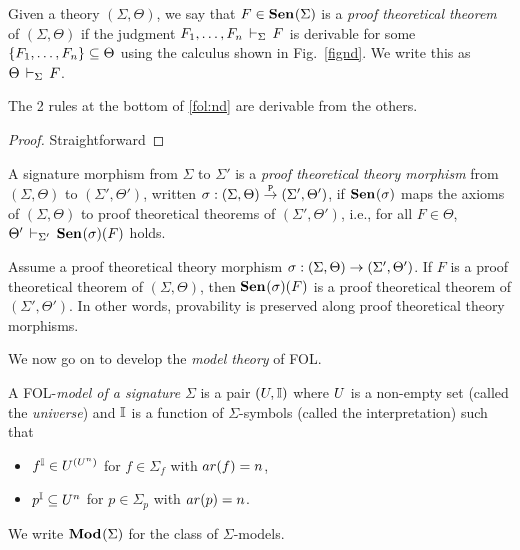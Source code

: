\documentclass{article}
\begin{document}
\begin{definition}
Given a theory $(\Sigma,\Theta)$, we say that $F\in{\mathbf{Sen}^{}}(\Sigma)$ is a \emph{proof theoretical theorem} of $(\Sigma,\Theta)$ if the judgment $F_1,\ldots,F_n\,\vdash_{\Sigma}\,F$ is derivable for some $\{F_1,\ldots,F_n\}\subseteq\Theta$ using the calculus shown in Fig.~\ref{fignd}. We write this as $\Theta\,\vdash_{\Sigma}\,F$.
\end{definition}

\begin{lemma} 
The 2 rules at the bottom of \ref{fol:nd} are derivable from the others.
\end{lemma}

\begin{proof}
Straightforward
\end{proof}

\begin{definition}
A signature morphism from $\Sigma$ to $\Sigma'$ is a \emph{proof theoretical theory morphism} from $(\Sigma,\Theta)$ to $(\Sigma',\Theta')$, written  $\sigma:(\Sigma,\Theta)\stackrel{\mathtt{P}}{\rightarrow}(\Sigma',\Theta')$, if ${\mathbf{Sen}^{}}(\sigma)$ maps the axioms of $(\Sigma,\Theta)$ to proof theoretical theorems of $(\Sigma',\Theta')$, i.e., for all $F\in\Theta$,
$\Theta'\,\vdash_{\Sigma'}\,{\mathbf{Sen}^{}}({\sigma})(F)$ holds.
\end{definition}

\begin{lemma}
Assume a proof theoretical theory morphism\linebreak
$\sigma:(\Sigma,\Theta)\rightarrow(\Sigma',\Theta')$. If $F$ is a proof theoretical theorem of $(\Sigma,\Theta)$, then ${\mathbf{Sen}^{}}(\sigma)(F)$ is a proof theoretical theorem of $(\Sigma',\Theta')$. In other words, provability is preserved along proof theoretical theory morphisms.
\end{lemma}

We now go on to develop the \emph{model theory} of FOL.

\begin{definition}\label{def:model}
A FOL-\emph{model of a signature} $\Sigma$ is a pair $(U,\mathbb{I})$ where $U$ is a non-empty set (called the \emph{universe}) and $\mathbb{I}$ is a function of $\Sigma$-symbols (called the interpretation) such that
\begin{itemize}
\item $f^{\mathbb{I}}\in U^{(U^n)}$ for $f\in \Sigma_f$ with $ar(f)=n$,
\item $p^{\mathbb{I}}\subseteq U^n$ for $p\in \Sigma_p$ with $ar(p) = n$.
\end{itemize}
We write ${\mathbf{Mod}^{}}(\Sigma)$ for the class of $\Sigma$-models.
\end{definition}
\end{document}
